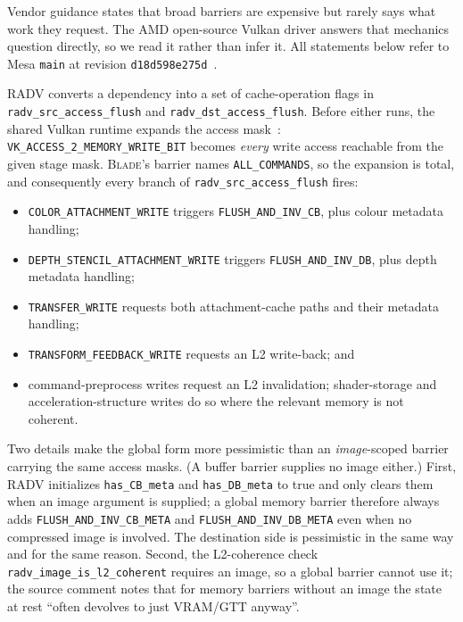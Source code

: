 \documentclass[10pt,twocolumn]{article}
\newcommand{\blade}{\textsc{Blade}}
\begin{document}
Vendor guidance states that broad barriers are expensive but rarely says what
work they request. The AMD open-source Vulkan driver answers that mechanics
question directly, so we read it rather than infer it. All statements below refer to
Mesa \texttt{main} at revision \texttt{d18d598e275d}~\cite{mesa-radv}.

RADV converts a dependency into a set of cache-operation flags in
\texttt{radv\_src\_access\_flush} and \texttt{radv\_dst\_access\_flush}. Before
either runs, the shared Vulkan runtime expands the access
mask~\cite{mesa-vk-synchronization}: \texttt{VK\_ACCESS\_2\_MEMORY\_WRITE\_BIT}
becomes \emph{every} write access reachable from the given stage mask.
\blade's barrier names \texttt{ALL\_COMMANDS}, so the expansion is total, and
consequently every branch of \texttt{radv\_src\_access\_flush} fires:

\begin{itemize}
  \item \texttt{COLOR\_ATTACHMENT\_WRITE} triggers
  \texttt{FLUSH\_AND\_INV\_CB}, plus colour metadata handling;
  \item \texttt{DEPTH\_STENCIL\_ATTACHMENT\_WRITE} triggers
  \texttt{FLUSH\_AND\_INV\_DB}, plus depth metadata handling;
  \item \texttt{TRANSFER\_WRITE} requests both attachment-cache paths and their
  metadata handling;
  \item \texttt{TRANSFORM\_FEEDBACK\_WRITE} requests an L2 write-back; and
  \item command-preprocess writes request an L2 invalidation; shader-storage
  and acceleration-structure writes do so where the relevant memory is not
  coherent.
\end{itemize}

Two details make the global form more pessimistic than an \emph{image}-scoped
barrier carrying the same access masks. (A buffer barrier supplies no image
either.) First, RADV initializes
\texttt{has\_CB\_meta} and \texttt{has\_DB\_meta} to true and only clears them
when an image argument is supplied; a global memory barrier therefore always
adds \texttt{FLUSH\_AND\_INV\_CB\_META} and \texttt{FLUSH\_AND\_INV\_DB\_META}
even when no compressed image is involved. The destination side is pessimistic
in the same way and for the same reason. Second, the L2-coherence check
\texttt{radv\_image\_is\_l2\_coherent} requires an image, so a global barrier
cannot use it; the source comment notes that for memory barriers without an
image the state at rest ``often devolves to just VRAM/GTT anyway''.
\end{document}
